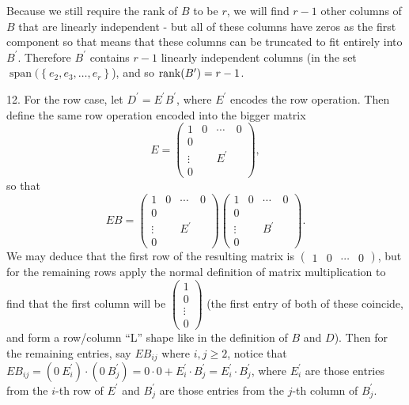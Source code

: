 \documentclass[11pt]{article}
\newcommand{\cbr}[1]{\left\{#1\right\}}
\DeclareMathOperator{\Span}{span}
\begin{document}
Because we still require the rank of $B$ to be $r$, we will find $r-1$ other columns of $B$ that are linearly independent - but all of these columns have zeros as the first component so that means that these columns can be truncated to fit entirely into $B^{\prime}$. Therefore $B^{\prime}$ contains $r-1$ linearly independent columns (in the set $\Span(\cbr{e_2,e_3,\dots, e_{r}}$), and so $\rank(B^{\prime}) = r-1$.

12. For the row case, let $D^{\prime} = E^{\prime}B^{\prime}$, where $E^{\prime}$ encodes the row operation. Then define the same row operation encoded into the bigger matrix $$E = \begin{pmatrix}
    1 & 0 & \cdots & 0 \\
    0 \\
    \vdots & & E^{\prime}\\
    0
\end{pmatrix},$$ so that $$EB = \begin{pmatrix}
    1 & 0 & \cdots & 0 \\
    0 \\
    \vdots & & E^{\prime}\\
    0
\end{pmatrix}\begin{pmatrix}
    1 & 0 & \cdots & 0 \\
    0 \\
    \vdots & & B^{\prime}\\
    0
\end{pmatrix}.$$ We may deduce that the first row of the resulting matrix is $\begin{pmatrix}
    1 & 0 & \cdots & 0
\end{pmatrix}$, but for the remaining rows apply the normal definition of matrix multiplication to find that the first column will be $\begin{pmatrix}
    1 \\ 0 \\\vdots \\ 0
\end{pmatrix}$ (the first entry of both of these coincide, and form a row/column ``L'' shape like in the definition of $B$ and $D$). Then for the remaining entries, say $EB_{ij}$ where $i,j \geq 2$, notice that $EB_{ij} = (0~ E^{\prime}_i)\cdot (0~ B^{\prime}_j) = 0\cdot 0 + E^{\prime}_i\cdot B^{\prime}_j = E^{\prime}_i\cdot B^{\prime}_j$, where $E^{\prime}_i$ are those entries from the $i$-th row of $E^{\prime}$ and $B^{\prime}_j$ are those entries from the $j$-th column of $B^{\prime}_j$.
\end{document}
